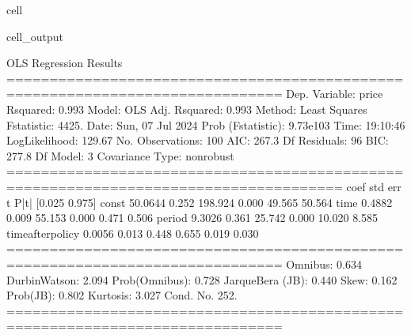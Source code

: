 \documentclass[letterpaper,10pt,english]{jupyterBook}
\begin{document}
\begin{sphinxuseclass}{cell}
\begin{sphinxVerbatimOutput}
\begin{sphinxuseclass}{cell_output}
\begin{sphinxVerbatim}[commandchars=\\\{\}]
                            OLS Regression Results                            
==============================================================================
Dep. Variable:                  price   R\PYGZhy{}squared:                       0.993
Model:                            OLS   Adj. R\PYGZhy{}squared:                  0.993
Method:                 Least Squares   F\PYGZhy{}statistic:                     4425.
Date:                Sun, 07 Jul 2024   Prob (F\PYGZhy{}statistic):          9.73e\PYGZhy{}103
Time:                        19:10:46   Log\PYGZhy{}Likelihood:                \PYGZhy{}129.67
No. Observations:                 100   AIC:                             267.3
Df Residuals:                      96   BIC:                             277.8
Df Model:                           3                                         
Covariance Type:            nonrobust                                         
=====================================================================================
                        coef    std err          t      P\PYGZgt{}|t|      [0.025      0.975]
\PYGZhy{}\PYGZhy{}\PYGZhy{}\PYGZhy{}\PYGZhy{}\PYGZhy{}\PYGZhy{}\PYGZhy{}\PYGZhy{}\PYGZhy{}\PYGZhy{}\PYGZhy{}\PYGZhy{}\PYGZhy{}\PYGZhy{}\PYGZhy{}\PYGZhy{}\PYGZhy{}\PYGZhy{}\PYGZhy{}\PYGZhy{}\PYGZhy{}\PYGZhy{}\PYGZhy{}\PYGZhy{}\PYGZhy{}\PYGZhy{}\PYGZhy{}\PYGZhy{}\PYGZhy{}\PYGZhy{}\PYGZhy{}\PYGZhy{}\PYGZhy{}\PYGZhy{}\PYGZhy{}\PYGZhy{}\PYGZhy{}\PYGZhy{}\PYGZhy{}\PYGZhy{}\PYGZhy{}\PYGZhy{}\PYGZhy{}\PYGZhy{}\PYGZhy{}\PYGZhy{}\PYGZhy{}\PYGZhy{}\PYGZhy{}\PYGZhy{}\PYGZhy{}\PYGZhy{}\PYGZhy{}\PYGZhy{}\PYGZhy{}\PYGZhy{}\PYGZhy{}\PYGZhy{}\PYGZhy{}\PYGZhy{}\PYGZhy{}\PYGZhy{}\PYGZhy{}\PYGZhy{}\PYGZhy{}\PYGZhy{}\PYGZhy{}\PYGZhy{}\PYGZhy{}\PYGZhy{}\PYGZhy{}\PYGZhy{}\PYGZhy{}\PYGZhy{}\PYGZhy{}\PYGZhy{}\PYGZhy{}\PYGZhy{}\PYGZhy{}\PYGZhy{}\PYGZhy{}\PYGZhy{}\PYGZhy{}\PYGZhy{}
const                50.0644      0.252    198.924      0.000      49.565      50.564
time                  0.4882      0.009     55.153      0.000       0.471       0.506
period               \PYGZhy{}9.3026      0.361    \PYGZhy{}25.742      0.000     \PYGZhy{}10.020      \PYGZhy{}8.585
time\PYGZus{}after\PYGZus{}policy     0.0056      0.013      0.448      0.655      \PYGZhy{}0.019       0.030
==============================================================================
Omnibus:                        0.634   Durbin\PYGZhy{}Watson:                   2.094
Prob(Omnibus):                  0.728   Jarque\PYGZhy{}Bera (JB):                0.440
Skew:                          \PYGZhy{}0.162   Prob(JB):                        0.802
Kurtosis:                       3.027   Cond. No.                         252.
==============================================================================


\end{sphinxVerbatim}
\end{sphinxuseclass}
\end{sphinxVerbatimOutput}
\end{sphinxuseclass}
\end{document}
